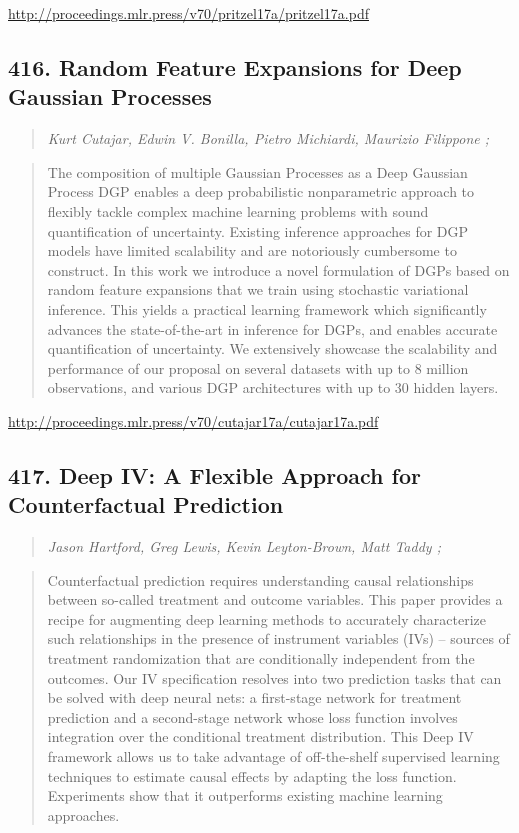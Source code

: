\documentclass{article}
\begin{document}
\href{http://proceedings.mlr.press/v70/pritzel17a/pritzel17a.pdf}{http://proceedings.mlr.press/v70/pritzel17a/pritzel17a.pdf}

\subsection{416. Random Feature Expansions for Deep Gaussian Processes}

\begin{quote}
\footnotesize{\textit{Kurt Cutajar, Edwin V. Bonilla, Pietro Michiardi, Maurizio Filippone ;}}
\end{quote}

\begin{quote}
    The composition of multiple Gaussian Processes as a Deep Gaussian Process DGP enables a deep probabilistic nonparametric approach to flexibly tackle complex machine learning problems with sound quantification of uncertainty. Existing inference approaches for DGP models have limited scalability and are notoriously cumbersome to construct. In this work we introduce a novel formulation of DGPs based on random feature expansions that we train using stochastic variational inference. This yields a practical learning framework which significantly advances the state-of-the-art in inference for DGPs, and enables accurate quantification of uncertainty. We extensively showcase the scalability and performance of our proposal on several datasets with up to 8 million observations, and various DGP architectures with up to 30 hidden layers.  \end{quote}

\href{http://proceedings.mlr.press/v70/cutajar17a/cutajar17a.pdf}{http://proceedings.mlr.press/v70/cutajar17a/cutajar17a.pdf}

\subsection{417. Deep IV: A Flexible Approach for Counterfactual Prediction}

\begin{quote}
\footnotesize{\textit{Jason Hartford, Greg Lewis, Kevin Leyton-Brown, Matt Taddy ;}}
\end{quote}

\begin{quote}
    Counterfactual prediction requires understanding causal relationships between so-called treatment and outcome variables. This paper provides a recipe for augmenting deep learning methods to accurately characterize such relationships in the presence of instrument variables (IVs) – sources of treatment randomization that are conditionally independent from the outcomes. Our IV specification resolves into two prediction tasks that can be solved with deep neural nets: a first-stage network for treatment prediction and a second-stage network whose loss function involves integration over the conditional treatment distribution. This Deep IV framework allows us to take advantage of off-the-shelf supervised learning techniques to estimate causal effects by adapting the loss function. Experiments show that it outperforms existing machine learning approaches.  \end{quote}
\end{document}
